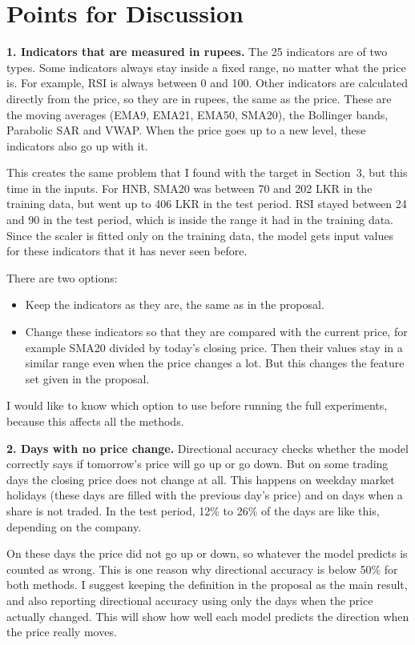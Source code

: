 \documentclass[11pt,a4paper]{article}
\begin{document}
\section{Points for Discussion}

\textbf{1. Indicators that are measured in rupees.}
The 25 indicators are of two types. Some indicators always stay inside a fixed range, no
matter what the price is. For example, RSI is always between 0 and 100. Other indicators
are calculated directly from the price, so they are in rupees, the same as the price. These
are the moving averages (EMA9, EMA21, EMA50, SMA20), the Bollinger bands, Parabolic SAR and
VWAP. When the price goes up to a new level, these indicators also go up with it.

This creates the same problem that I found with the target in Section~3, but this time in
the inputs. For HNB, SMA20 was between 70 and 202 LKR in the training data, but went up to
406 LKR in the test period. RSI stayed between 24 and 90 in the test period, which is inside
the range it had in the training data. Since the scaler is fitted only on the training data,
the model gets input values for these indicators that it has never seen before.

There are two options:
\begin{itemize}
  \item Keep the indicators as they are, the same as in the proposal.
  \item Change these indicators so that they are compared with the current price, for
        example SMA20 divided by today's closing price. Then their values stay in a similar
        range even when the price changes a lot. But this changes the feature set given in
        the proposal.
\end{itemize}
I would like to know which option to use before running the full experiments, because this
affects all the methods.

\textbf{2. Days with no price change.}
Directional accuracy checks whether the model correctly says if tomorrow's price will go up
or go down. But on some trading days the closing price does not change at all. This happens
on weekday market holidays (these days are filled with the previous day's price) and on days
when a share is not traded. In the test period, 12\% to 26\% of the days are like this,
depending on the company.

On these days the price did not go up or down, so whatever the model predicts is counted as
wrong. This is one reason why directional accuracy is below 50\% for both methods. I suggest
keeping the definition in the proposal as the main result, and also reporting directional
accuracy using only the days when the price actually changed. This will show how well each
model predicts the direction when the price really moves.
\end{document}
